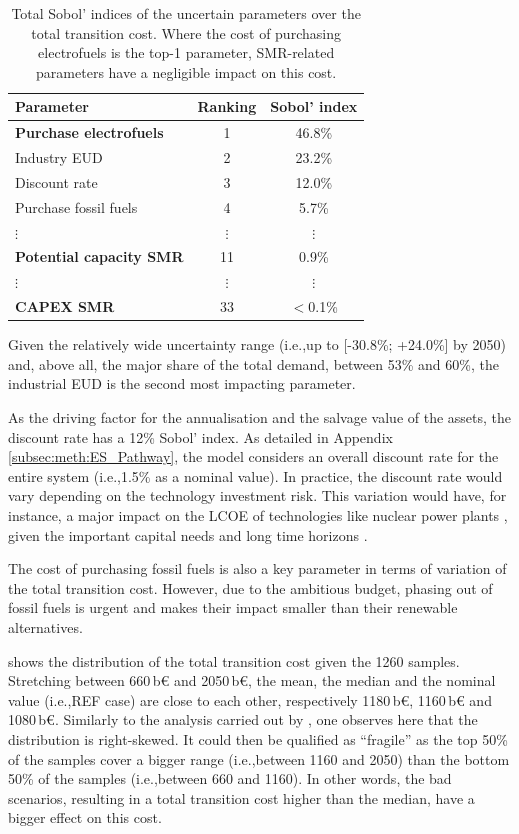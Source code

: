 \documentclass[11pt,twoside,a4paper,english]{article}
\def\ie{i.e.,}
\begin{document}
\begin{table}[htbp!]
\caption{Total Sobol' indices of the uncertain parameters over the total transition cost. Where the cost of purchasing electrofuels is the top-1 parameter, \gls{SMR}-related parameters have a negligible impact on this cost.}
\label{tab:UQ_short}
\centering
\begin{tabular}{l c c}
\toprule
\textbf{Parameter}  & \textbf{Ranking} & \textbf{Sobol' index} \\	
\midrule
\textbf{Purchase electrofuels} & 1 & 46.8\% \\
Industry EUD & 2 & 23.2\% \\
Discount rate & 3 & 12.0\% \\
Purchase fossil fuels  & 4 & 5.7\% \\
$\vdots$ & $\vdots$ & $\vdots$\\
\textbf{Potential capacity \gls{SMR}} & 11 & 0.9\% \\
$\vdots$ & $\vdots$ & $\vdots$\\
\textbf{CAPEX \gls{SMR}} & 33 & $<$0.1\% \\
\bottomrule							

\end{tabular}
\end{table}

Given the relatively wide uncertainty range (\ie up to [-30.8\%; +24.0\%] by 2050) and, above all, the major share of the total demand, between 53\% and 60\%, the industrial \gls{EUD} is the second most impacting parameter. 

As the driving factor for the annualisation and the salvage value of the assets, the discount rate has a 12\% Sobol' index. As detailed in Appendix \ref{subsec:meth:ES_Pathway}, the model considers an overall discount rate for the entire system (\ie 1.5\% as a nominal value). In practice, the discount rate would vary depending on the technology investment risk. This variation would have, for instance, a major impact on the \gls{LCOE} of technologies like nuclear power plants \cite{world_nuclear_asso}, given the important capital needs and long time horizons \cite{IEA_Nuclear_2022}.

The cost of purchasing fossil fuels is also a key parameter in terms of variation of the total transition cost. However, due to the ambitious  budget, phasing out of fossil fuels is urgent and makes their impact smaller than their renewable alternatives.

 shows the distribution of the total transition cost given the 1260 samples. Stretching between 660\,b€ and 2050\,b€, the mean, the median and the nominal value (\ie REF case) are close to each other, respectively 1180\,b€, 1160\,b€ and 1080\,b€. Similarly to the analysis carried out by \citet{coppitters2023optimizing}, one observes here that the distribution is right-skewed. It could then be qualified as ``fragile'' as the top 50\% of the samples cover a bigger range (\ie between 1160 and 2050) than the bottom 50\% of the samples (\ie between 660 and 1160). In other words, the bad scenarios, resulting in a total transition cost higher than the median, have a bigger effect on this cost.
\end{document}
